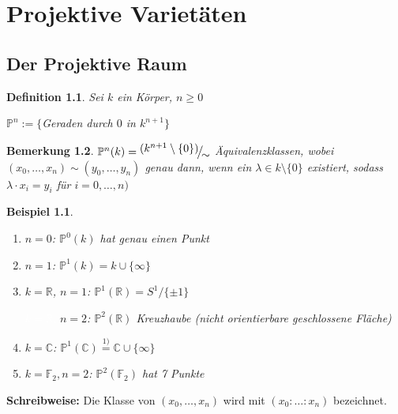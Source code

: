 \documentclass[a4paper, 12pt, numbers=noendperiod, chapterprefix=true, headsepline]{scrbook}
\theoremstyle{break}
\newtheorem{Def}{Definition}[section]
\newtheorem{Bem}[Def]{Bemerkung}
\theoremstyle{nonumberbreak}
\newtheorem{nnBsp}{Beispiel}
\theoremstyle{nonumberplain}
\newcommand{\quot}[1]{\textrm{\glqq}{#1}\textrm{\grqq}}
\newcommand{\linetitle}[1]{\textbf{#1}}
\newcommand{\R}{\mathbb{R}}
\newcommand{\C}{\mathbb{C}}
\newcommand{\F}{\mathbb{F}}
\newcommand{\IP}{\mathbb{P}}%
\newcommand{\FakRaum}[2]{
  \raisebox{0.7ex}{\ensuremath{#1}}
  \ensuremath{\mkern-3mu}\big/\ensuremath{\mkern-3mu}
  \raisebox{-0.6ex}{\ensuremath{#2}}}
\begin{document}
\newpage

\chapter{Projektive Variet\"aten}
\setcounter{section}{8}
\section{Der Projektive Raum}

\begin{Def}
Sei $k$ ein K\"orper, $n\geq0$

$\IP^n:=\{$Geraden durch $0$ in $k^{n+1}\}$
\end{Def}

\begin{Bem}
$\IP^n(k)=\FakRaum{(k^{n+1} \setminus \{0 \})}{\sim}$ \"Aquivalenzklassen, wobei $(x_0,\dots ,x_n) \sim (y_0,\dots ,y_n)$ genau dann, wenn ein $\lambda \in k\setminus \{0\}$ existiert, sodass $\lambda \cdot x_i = y_i$ f\"ur $i=0,\dots ,n)$
\end{Bem}

\begin{nnBsp}\begin{enumerate}[1)]
\item[0)]
	$n=0$: $\IP^0(k)$ hat genau einen Punkt

\item
	$n=1$: $\IP^1(k)=k\cup\{\infty\}$

\item
	$k=\R$, $n=1$: $\IP^1(\R)=S^1/\{\pm 1\}$
	
	\textcolor{white}{$k=\R$, }$n=2$: $\IP^2(\R)$ \quot{Kreuzhaube} (nicht orientierbare geschlossene Fl\"ache)

\item
	$k=\C$: $\IP^1(\C) \overset{1)}{=} \C \cup \{\infty\}$

\item
	$k=\F_2, n=2$: $\IP^2(\F_2)$ hat 7 Punkte
\end{enumerate}\end{nnBsp}

\linetitle{Schreibweise:} Die Klasse von $(x_0,\dots ,x_n)$ wird mit $(x_0:\ldots :x_n)$ bezeichnet.
\end{document}
